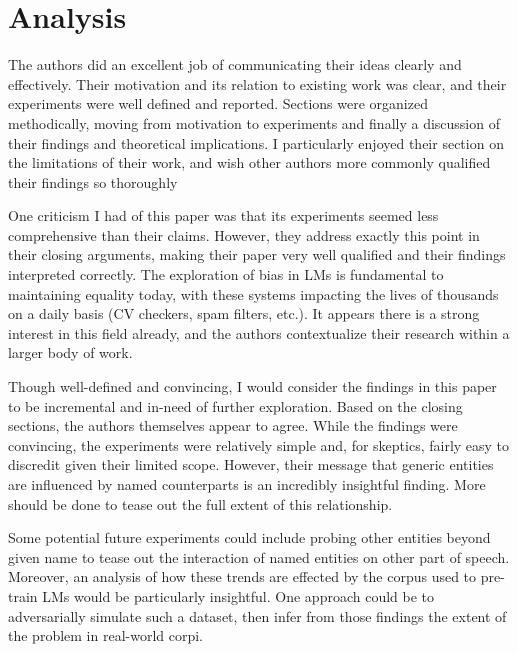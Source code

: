 \documentclass[11pt,a4paper]{article}
\begin{document}
\section{Analysis}%
\vspace{-1pt}
\label{sec:Analysis}

The authors did an excellent job of communicating their ideas clearly and effectively. Their motivation and its relation to existing work was clear, and their experiments were well defined and reported. Sections were organized methodically, moving from motivation to experiments and finally a discussion of their findings and theoretical implications. I particularly enjoyed their section on the limitations of their work, and wish other authors more commonly qualified their findings so thoroughly

One criticism I had of this paper was that its experiments seemed less comprehensive than their claims. However, they address exactly this point in their closing arguments, making their paper very well qualified and their findings interpreted correctly. The exploration of bias in LMs is fundamental to maintaining equality today, with these systems impacting the lives of thousands on a daily basis (CV checkers, spam filters, etc.). It appears there is a strong interest in this field already, and the authors contextualize their research within a larger body of work.

Though well-defined and convincing, I would consider the findings in this paper to be incremental and in-need of further exploration. Based on the closing sections, the authors themselves appear to agree. While the findings were convincing, the experiments were relatively simple and, for skeptics, fairly easy to discredit given their limited scope. However, their message that generic entities are influenced by named counterparts is an incredibly insightful finding. More should be done to tease out the full extent of this relationship.

Some potential future experiments could include probing other entities beyond given name to tease out the interaction of named entities on other part of speech. Moreover, an analysis of how these trends are effected by the corpus used to pre-train LMs would be particularly insightful. One approach could be to adversarially simulate such a dataset, then infer from those findings the extent of the problem in real-world corpi.
\vspace{-10pt}


\end{document}
